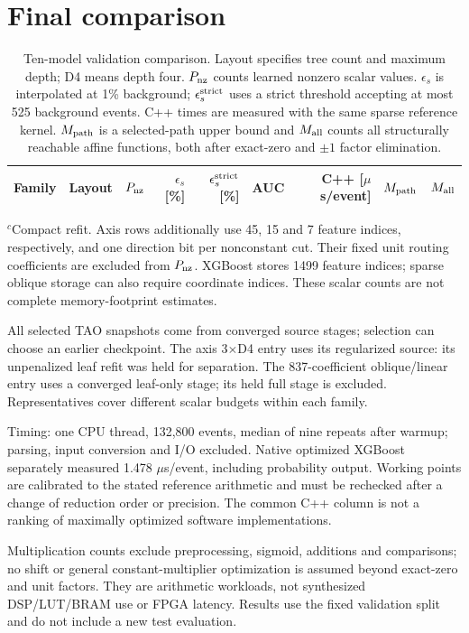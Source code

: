 \clearpage
\section*{Final comparison}
\begin{table}[H]\centering\normalsize
\caption{Ten-model validation comparison. Layout specifies tree count and
maximum depth; D4 means depth four. $P_{\rm nz}$ counts learned nonzero scalar
values. $\epsilon_s$ is interpolated at 1\% background;
$\epsilon_s^{\rm strict}$ uses a strict threshold accepting at most 525
background events. C++ times are measured with the same sparse reference
kernel. $M_{\rm path}$ is a selected-path upper bound and $M_{\rm all}$ counts
all structurally reachable affine functions, both after exact-zero and
$\pm1$ factor elimination.}
\label{tab:comparison}
\setlength{\tabcolsep}{4pt}\renewcommand{\arraystretch}{1.28}
\begin{tabular}{@{}llrrrrrrr@{}}\toprule
Family & Layout & $P_{\rm nz}$ & \shortstack{$\epsilon_s$\\{[\%]}} & \shortstack{$\epsilon_s^{\rm strict}$\\{[\%]}} & AUC & \shortstack{C++\\{[$\mu$s/event]}} & $M_{\rm path}$ & $M_{\rm all}$\\\midrule

\end{tabular}

\vspace{8pt}
\begin{minipage}{\textwidth}\small
$^{c}$Compact refit. Axis rows additionally use 45, 15 and 7 feature indices,
respectively, and one direction bit per nonconstant cut. Their fixed unit
routing coefficients are excluded from $P_{\rm nz}$. XGBoost stores 1499
feature indices; sparse oblique storage can also require coordinate indices.
These scalar counts are not complete memory-footprint estimates.

All selected TAO snapshots come from converged source stages; selection can choose
an earlier checkpoint. The axis 3$\times$D4 entry uses its regularized source:
its unpenalized leaf refit was held for separation. The 837-coefficient
oblique/linear entry uses a converged leaf-only stage; its held full stage is
excluded. Representatives cover different scalar budgets within each family.

Timing: one CPU thread, 132,800 events, median of nine repeats after warmup;
parsing, input conversion and I/O excluded. Native optimized XGBoost separately
measured 1.478 $\mu$s/event, including probability output. Working points are calibrated to the stated
reference arithmetic and must be rechecked after a change of reduction order
or precision. The common C++
column is not a ranking of maximally optimized software implementations.

Multiplication counts exclude preprocessing, sigmoid, additions and
comparisons; no shift or general constant-multiplier optimization is assumed
beyond exact-zero and unit factors. They are arithmetic workloads, not
synthesized DSP/LUT/BRAM use or FPGA latency. Results use the fixed validation
split and do not include a new test evaluation.
\end{minipage}
\end{table}
